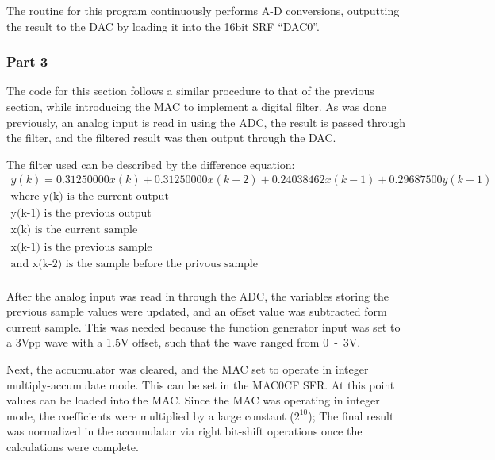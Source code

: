 \documentclass[12pt]{article}
\begin{document}
The routine for this program continuously performs A-D conversions, outputting the result to the DAC by loading it into the 16bit SRF ``DAC0''.

\subsubsection{Part 3}

The code for this section follows a similar procedure to that of the previous section, while introducing the MAC to implement a digital filter. As was done previously, an analog input is read in using the ADC, the result is passed through the filter, and the filtered result was then output through the DAC.

The filter used can be described by the difference equation:
\begin{gather*}
y(k) = 0.31250000x(k) + 0.31250000x(k-2) + 0.24038462x(k-1) + 0.29687500y(k-1)\\
\text{where y(k) is the current output}\\
\text{y(k-1) is the previous output}\\
\text{x(k) is the current sample}\\
\text{x(k-1) is the previous sample}\\
\text{and x(k-2) is the sample before the privous sample}\\
\end{gather*}

After the analog input was read in through the ADC, the variables storing the previous sample values were updated, and an offset value was subtracted form current sample. This was needed because the function generator input was set to a \si{3}{Vpp} wave with a \si{\num{1.5}}{V} offset, such that the wave ranged from \si{0-3}{V}.

Next, the accumulator was cleared, and the MAC set to operate in integer multiply-accumulate mode. This can be set in the MAC0CF SFR. At this point values can be loaded into the MAC. Since the MAC was operating in integer mode, the coefficients were multiplied by a large constant ($2^{10}$); The final result was normalized in the accumulator via right bit-shift operations once the calculations were complete.    
\end{document}
